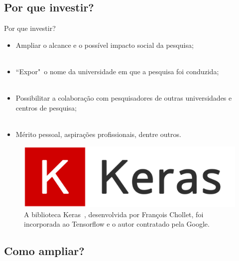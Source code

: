 \subsection{Por que investir?}
\label{ss.why_visibility}

\begin{frame}{Por que investir?}
	\justify 
	\begin{itemize}
		\item<1> Ampliar o alcance e o possível impacto social da pesquisa;
		\\~\\
		\item<2> ``Expor"~o nome da universidade em que a pesquisa foi conduzida;
		\\~\\
		\item<3> Possibilitar a colaboração com pesquisadores de outras universidades e centros de pesquisa;
		\\~\\
		\item<4> Mérito pessoal, aspirações profissionais, dentre outros.
	\end{itemize}
\end{frame}

\begin{frame}{}
	\centering
	\begin{figure}
		\includegraphics[scale=0.2]{figs/keras.png}
		\caption{A biblioteca Keras~\cite{Chollet:15}, desenvolvida por François Chollet, foi incorporada ao Tensorflow e o autor contratado pela Google.}
		\label{f.keras}
	\end{figure}
\end{frame}


\subsection{Como ampliar?}
\label{ss.how_visibility}

